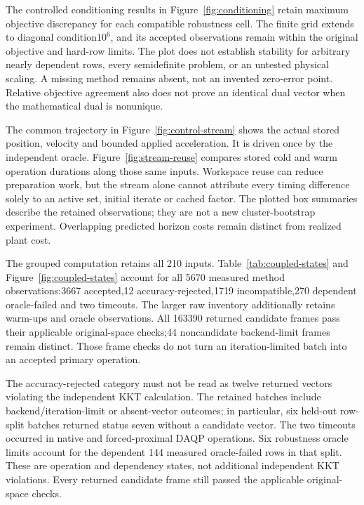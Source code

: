 The controlled conditioning results in Figure~\ref{fig:conditioning} retain
maximum objective discrepancy for each compatible robustness cell. The
finite grid extends to diagonal condition$10^6$, and its accepted observations
remain within the original objective and hard-row limits. The plot does not
establish stability for arbitrary nearly dependent rows, every semidefinite
problem, or an untested physical scaling. A missing method remains absent,
not an invented zero-error point. Relative objective agreement also does
not prove an identical dual vector when the mathematical dual is nonunique.


The common trajectory in Figure~\ref{fig:control-stream} shows the actual
stored position, velocity and bounded applied acceleration. It is driven
once by the independent oracle. Figure~\ref{fig:stream-reuse} compares stored
cold and warm operation durations along those same inputs. Workspace reuse
can reduce preparation work, but the stream alone cannot attribute every
timing difference solely to an active set, initial iterate or cached factor.
The plotted box summaries describe the retained observations; they are not
a new cluster-bootstrap experiment. Overlapping predicted horizon costs
remain distinct from realized plant cost.



The grouped computation retains all 210 inputs. Table~\ref{tab:coupled-states}
and Figure~\ref{fig:coupled-states} account for all 5670 measured method
observations:3667 accepted,12 accuracy-rejected,1719 incompatible,270 dependent
oracle-failed and two timeouts. The larger raw inventory additionally retains
warm-ups and oracle observations. All 163390 returned candidate frames pass
their applicable original-space checks;44 noncandidate backend-limit frames
remain distinct. Those frame checks do not turn an iteration-limited batch
into an accepted primary operation.

The accuracy-rejected category must not be read as twelve returned
vectors violating the independent KKT calculation. The retained batches
include backend/iteration-limit or absent-vector outcomes; in particular,
six held-out row-split batches returned status seven without a candidate
vector. The two timeouts occurred in native and forced-proximal DAQP
operations. Six robustness oracle limits account for the dependent
144 measured oracle-failed rows in that split. These are operation and
dependency states, not additional independent KKT violations. Every
returned candidate frame still passed the applicable original-space checks.



